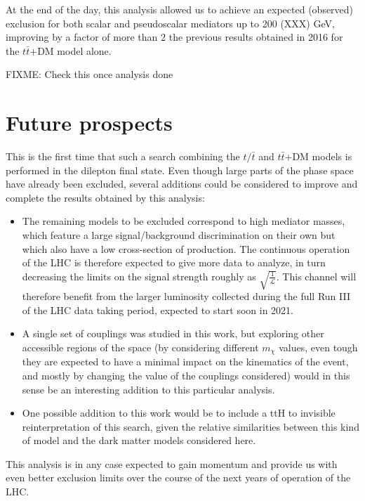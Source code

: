 \documentclass[a4paper, 10pt, openright]{report}
\begin{document}
At the end of the day, this analysis allowed us to achieve an expected (observed) exclusion for both scalar and pseudoscalar mediators up to 200 (XXX) GeV, improving by a factor of more than 2 the previous results obtained in 2016 for the $t \bar t$+DM model alone.

\color{red} FIXME: Check this once analysis done \color{black}

\section{Future prospects}

This is the first time that such a search combining the $t/\bar t$ and $t \bar t$+DM models is performed in the dilepton final state. Even though large parts of the phase space have already been excluded, several additions could be considered to improve and complete the results obtained by this analysis:

\begin{itemize}
\item The remaining models to be excluded correspond to high mediator masses, which feature a large signal/background discrimination on their own but which also have a low cross-section of production. The continuous operation of the \ac{LHC} is therefore expected to give more data to analyze, in turn decreasing the limits on the signal strength roughly as $\sqrt{\frac{1}{\mathcal{L}}}$. This channel will therefore benefit from the larger luminosity collected during the full Run III of the LHC data taking period, expected to start soon in 2021.
\item A single set of couplings was studied in this work, but exploring other accessible regions of the space (by considering different $m_\chi$ values, even tough they are expected to have a minimal impact on the kinematics of the event, and mostly by changing the value of the couplings considered) would in this sense be an interesting addition to this particular analysis.
\item One possible addition to this work would be to include a ttH to invisible reinterpretation of this search, given the relative similarities between this kind of model and the dark matter models considered here. 
\end{itemize}

This analysis is in any case expected to gain momentum and provide us with even better exclusion limits over the course of the next years of operation of the \ac{LHC}.
\end{document}

